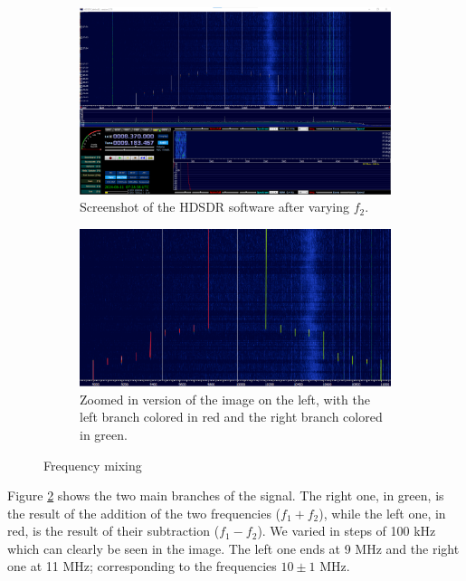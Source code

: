 \documentclass{article}
\begin{document}
\begin{figure}[h]
	\centering
	\begin{subfigure}[t]{0.45\textwidth}
		\includegraphics[width=\textwidth]{Figures/Task 1/Mixing.png}
		\caption{Screenshot of the HDSDR software after varying $f_2$.}
		\label{fig:mixing}
	\end{subfigure}
	\hspace{0.5cm}
	\begin{subfigure}[t]{0.45\textwidth}
		\includegraphics[width=\textwidth]{Figures/Task 1/MixingColored.png}
		\caption{Zoomed in version of the image on the left, with the left branch colored in red and the right branch colored in green.}
		\label{fig:mixing_colored}
	\end{subfigure}
	\caption{Frequency mixing}
	\label{fig:mixing_all}
\end{figure}

Figure \ref{fig:mixing_colored} shows the two main branches of the signal. The right one, in green, is the result of the addition of the two frequencies ($f_1+f_2$), while the left one, in red, is the result of their subtraction ($f_1-f_2$). 
We varied in steps of 100 kHz which can clearly be seen in the image. The left one ends at 9 MHz and the right one at 11 MHz; corresponding to the frequencies $ 10 \pm 1 $ MHz. 
\end{document}

